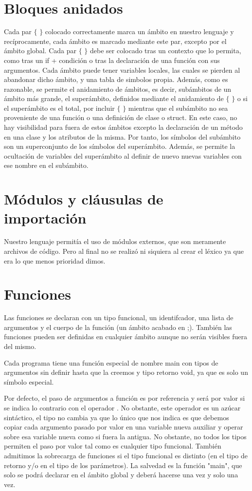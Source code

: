 \section{Bloques anidados}
Cada par $\{$ $\}$ colocado correctamente marca un ámbito en nuestro lenguaje y recíprocamente, cada ámbito es marcado mediante este par, excepto por el ámbito global. Cada par $\{$ $\}$ debe ser colocado tras un contexto que lo permita, como tras un if + condición o tras la declaración de una función con sus argumentos. Cada ámbito puede tener variables locales, las cuales se pierden al abandonar dicho ámbito, y una tabla de simbolos propia. Además, como es razonable, se permite el anidamiento de ámbitos, es decir, subámbitos de un ámbito más grande, el superámbito, definidos mediante el anidamiento de $\{$ $\}$ o si el superámbito es el total, por incluir  $\{$ $\}$ mientras que el sub\'{a}mbito no sea proveniente de una funci\'{o}n o una definici\'{o}n de clase o struct. En este caso, no hay visibilidad para fuera de estos \'{a}mbitos excepto la declaraci\'{o}n de un m\'{e}todo en una clase y los atributos de la misma. Por tanto, los símbolos del subámbito son un superconjunto de los símbolos del superámbito.
Además, se permite la ocultación de variables del superámbito al definir de nuevo nuevas variables con ese nombre en el subámbito.

\section{Módulos y cláusulas de importación}
Nuestro lenguaje permit\'{i}a el uso de módulos externos, que son meramente archivos de código. Pero al final no se realiz\'{o} ni siquiera al crear el léxico ya que era lo que menos prioridad dimos.
\newpage
\section{Funciones}
Las funciones se declaran con un tipo funcional, un identifcador, una lista de argumentos y el cuerpo de la función (un ámbito acabado en ;). Tambi\'{e}n las funciones pueden ser definidas en cualquier \'{a}mbito aunque no ser\'{a}n visibles fuera del mismo.

Cada programa tiene una función especial de nombre main con tipos de argumentos sin definir hasta que la creemos y tipo retorno void, ya que es solo un símbolo especial. 

Por defecto, el paso de argumentos a función es por referencia y será por valor si se indica lo contrario con el operador \Val. No obstante, este operador es un azúcar sintáctico, el tipo no cambia ya que lo único que nos indica es que debemos copiar cada argumento pasado por valor en una variable nueva auxiliar y operar sobre esa variable nueva como si fuera la antigua. No obstante, no todos los tipos permiten el paso por valor tal como es cualquier tipo funcional. También admitimos la sobrecarga de funciones si el tipo funcional es distinto
(en el tipo de retorno y/o en el tipo de los parámetros). La salvedad es la función "main", que solo se podrá declarar en el ámbito global y deberá hacerse una vez y solo una vez.